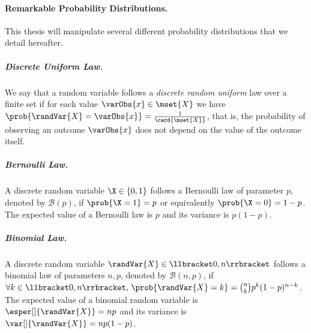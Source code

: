 \paragraph{Remarkable Probability Distributions.}
This thesis will manipulate several different probability distributions that we detail hereafter.

\subparagraph{Discrete Uniform Law.}
We say that a random variable  follows a \emph{discrete random uniform} law  over a finite set  if for each value \(\varObs{x} \in \mset{X}\) we have \(\prob{\randVar{X} = \varObs{x}} = \frac{1}{\card{\mset{X}}}\), that is, the probability of observing an outcome \(\varObs{x}\) does not depend on the value of the outcome itself.

\subparagraph{Bernoulli Law.}
A discrete random variable \(\X \in \{0,1\}\) follows a Bernoulli law of parameter \(p\), denoted by \(\mathcal{B}(p)\), if \(\prob{\X = 1} = p\) or equivalently \(\prob{\X = 0} = 1 - p\).
The expected value of a Bernoulli law is \(p\) and its variance is \(p(1-p)\).

\subparagraph{Binomial Law.}
A discrete random variable \(\randVar{X} \in \llbracket 0,n\rrbracket\) follows a binomial law of parameters \(n,p\), denoted by \(\mathcal{B}(n, p)\), if \(\forall k \in \llbracket 0,n\rrbracket \mbox{, } \prob{\randVar{X} = k} = \binom{n}{k}p^k(1-p)^{n-k}\).
The expected value of a binomial random variable is \(\esper[]{\randVar{X}} = np\) and its variance is \(\var[]{\randVar{X}} = np(1-p)\).

